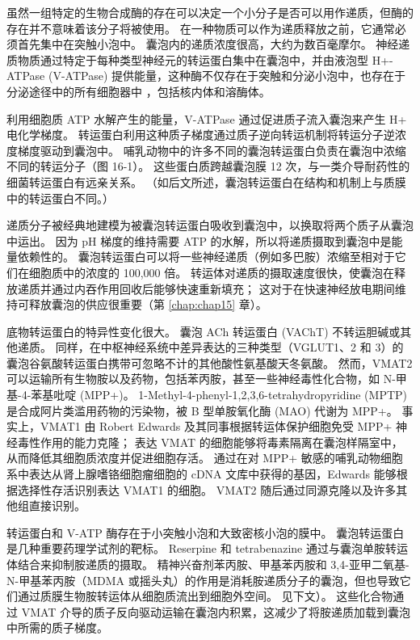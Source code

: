 虽然一组特定的生物合成酶的存在可以决定一个小分子是否可以用作递质，但酶的存在并不意味着该分子将被使用。 
在一种物质可以作为递质释放之前，它通常必须首先集中在突触小泡中。 
囊泡内的递质浓度很高，大约为数百毫摩尔。 
神经递质物质通过特定于每种类型神经元的转运蛋白集中在囊泡中，并由液泡型 H+-ATPase (V-ATPase) 提供能量，这种酶不仅存在于突触和分泌小泡中，也存在于分泌途径中的所有细胞器中 ，包括核内体和溶酶体。


利用细胞质 ATP 水解产生的能量，V-ATPase 通过促进质子流入囊泡来产生 H+ 电化学梯度。 
转运蛋白利用这种质子梯度通过质子逆向转运机制将转运分子逆浓度梯度驱动到囊泡中。 
哺乳动物中的许多不同的囊泡转运蛋白负责在囊泡中浓缩不同的转运分子（图 16-1）。 
这些蛋白质跨越囊泡膜 12 次，与一类介导耐药性的细菌转运蛋白有远亲关系。 
（如后文所述，囊泡转运蛋白在结构和机制上与质膜中的转运蛋白不同。）


递质分子被经典地建模为被囊泡转运蛋白吸收到囊泡中，以换取将两个质子从囊泡中运出。 
因为 pH 梯度的维持需要 ATP 的水解，所以将递质摄取到囊泡中是能量依赖性的。 
囊泡转运蛋白可以将一些神经递质（例如多巴胺）浓缩至相对于它们在细胞质中的浓度的 100,000 倍。 
转运体对递质的摄取速度很快，使囊泡在释放递质并通过内吞作用回收后能够快速重新填充； 
这对于在快速神经放电期间维持可释放囊泡的供应很重要（第 \ref{chap:chap15} 章）。


底物转运蛋白的特异性变化很大。 
囊泡 ACh 转运蛋白 (VAChT) 不转运胆碱或其他递质。 
同样，在中枢神经系统中差异表达的三种类型（VGLUT1、2 和 3）的囊泡谷氨酸转运蛋白携带可忽略不计的其他酸性氨基酸天冬氨酸。 
然而，VMAT2 可以运输所有生物胺以及药物，包括苯丙胺，甚至一些神经毒性化合物，如 N-甲基-4-苯基吡啶 (MPP+)。 
1-Methyl-4-phenyl-1,2,3,6-tetrahydropyridine (MPTP) 是合成阿片类滥用药物的污染物，被 B 型单胺氧化酶 (MAO) 代谢为 MPP+。
事实上，VMAT1 由 Robert Edwards 及其同事根据转运体保护细胞免受 MPP+ 神经毒性作用的能力克隆； 表达 VMAT 的细胞能够将毒素隔离在囊泡样隔室中，从而降低其细胞质浓度并促进细胞存活。 
通过在对 MPP+ 敏感的哺乳动物细胞系中表达从肾上腺嗜铬细胞瘤细胞的 cDNA 文库中获得的基因，Edwards 能够根据选择性存活识别表达 VMAT1 的细胞。 
VMAT2 随后通过同源克隆以及许多其他组直接识别。


转运蛋白和 V-ATP 酶存在于小突触小泡和大致密核小泡的膜中。 
囊泡转运蛋白是几种重要药理学试剂的靶标。 Reserpine 和 tetrabenazine 通过与囊泡单胺转运体结合来抑制胺递质的摄取。 
精神兴奋剂苯丙胺、甲基苯丙胺和 3,4-亚甲二氧基-N-甲基苯丙胺（MDMA 或摇头丸）的作用是消耗胺递质分子的囊泡，但也导致它们通过质膜生物胺转运体从细胞质流出到细胞外空间。 见下文）。 
这些化合物通过 VMAT 介导的质子反向驱动运输在囊泡内积累，这减少了将胺递质加载到囊泡中所需的质子梯度。


